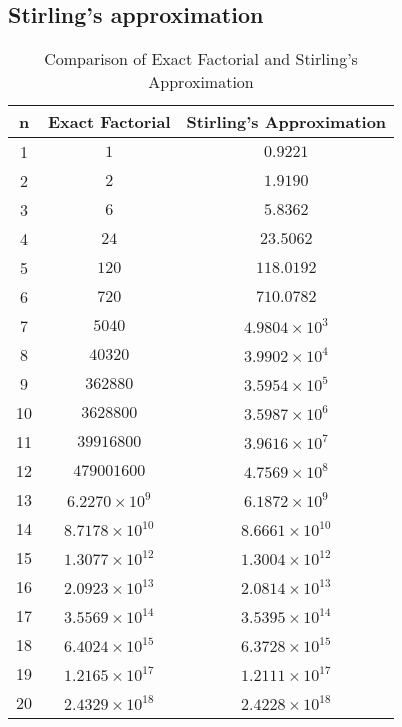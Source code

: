 \begin{appendices}

\section{Stirling's approximation}
\begin{table}[ht]
\centering
\begin{tabular}{|c|c|c|}
\toprule
\textbf{n} & \textbf{Exact Factorial} & \textbf{Stirling's Approximation} \\ \midrule
1 & $1$ & $0.9221$ \\
2 & $2$ & $1.9190$ \\
3 & $6$ & $5.8362$ \\
4 & $24$ & $23.5062$ \\
5 & $120$ & $118.0192$ \\
6 & $720$ & $710.0782$ \\
7 & $5040$ & $4.9804 \times 10^3$ \\
8 & $40320$ & $3.9902 \times 10^4$ \\
9 & $362880$ & $3.5954 \times 10^5$ \\
10 & $3628800$ & $3.5987 \times 10^6$ \\
11 & $39916800$ & $3.9616 \times 10^7$ \\
12 & $479001600$ & $4.7569 \times 10^8$ \\
13 & $6.2270 \times 10^9$ & $6.1872 \times 10^9$ \\
14 & $8.7178 \times 10^{10}$ & $8.6661 \times 10^{10}$ \\
15 & $1.3077 \times 10^{12}$ & $1.3004 \times 10^{12}$ \\
16 & $2.0923 \times 10^{13}$ & $2.0814 \times 10^{13}$ \\
17 & $3.5569 \times 10^{14}$ & $3.5395 \times 10^{14}$ \\
18 & $6.4024 \times 10^{15}$ & $6.3728 \times 10^{15}$ \\
19 & $1.2165 \times 10^{17}$ & $1.2111 \times 10^{17}$ \\
20 & $2.4329 \times 10^{18}$ & $2.4228 \times 10^{18}$ \\
\bottomrule
\end{tabular}
\caption{Comparison of Exact Factorial and Stirling's Approximation}
\label{tab:factorial_stirling}
\end{table}

\newpage

\end{appendices}
